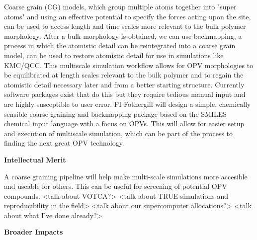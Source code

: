 Coarse grain (CG) models, which group multiple atoms together into "super atoms" and using an effective potential to specify the forces acting upon the site, can be used to access length and time scales more relevant to the bulk polymer morphology.
After a bulk morphology is obtained, we can use backmapping, a process in which the atomistic detail can be reintegrated into a coarse grain model, can be used to restore atomistic detail for use in simulations like KMC/QCC.
This multiscale simulation workflow allows for OPV morphologies to be equilibrated at length scales relevant to the bulk polymer and to regain the atomistic detail necessary later and from a better starting structure.
Currently software packages exist that do this but they require tedious manual input and are highly susceptible to user error.
PI Fothergill will design a simple, chemically sensible coarse graining and backmapping package based on the SMILES chemical input language with a focus on OPVs.
This will allow for easier setup and execution of multiscale simulation, which can be part of the process to finding the next great OPV technology.

\begin{center}
    \textbf{Intellectual Merit}
\end{center}

A coarse graining pipeline will help make multi-scale simulations more accesible and useable for others. 
This can be useful for screening of potential OPV compounds.
<talk about VOTCA?>
<talk about TRUE simulations and reproducibility in the field>
<talk about our supercomputer allocations?>
<talk about what I've done already?>

\begin{center}
    \textbf{Broader Impacts}
\end{center}

